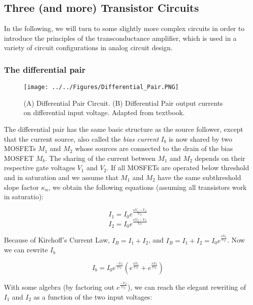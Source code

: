 \subsection{Three (and more) Transistor Circuits}

In the following, we will turn to some slightly more complex circuits in order to introduce the principles of the transconductance amplifier, which is used in a variety of circuit configurations in analog circuit design.

\subsubsection{The differential pair}
\label{section:diffpair}
\begin{figure}[H]
    \centering
    \texttt{[image: ../../Figures/Differential\_Pair.PNG]}
    \caption{(A) Differential Pair Circuit. (B) Differential Pair output currents on differential input voltage. Adapted from textbook.}
    \label{fig:Differential_Pair}
\end{figure}

The differential pair has the same basic structure as the source follower, except that the current source, also called the \textit{bias current} $I_b$ is now shared by two MOSFETs $M_1$ and $M_2$ whose sources are connected to the drain of the bias MOSFET $M_b$. The sharing of the current between $M_1$ and $M_2$ depends on their respective gate voltages $V_1$ and $V_2$. If all MOSFETs are operated below threshold and in saturation and we assume that $M_1$ and $M_2$ have the same subthreshold slope factor $\kappa_n$, we obtain the following equations (assuming all transistors work in saturatio):

\begin{equation}
    I_1 = I_0 e^{\frac{\kappa V_1 - V_S}{U_T}}
\end{equation}
\begin{equation}
    I_2 = I_0 e^{\frac{\kappa V_2 - V_S}{U_T}}
\end{equation}

Because of Kirchoff's Current Law, $I_B = I_1 + I_2$, and $I_B = I_1 + I_2 = I_0 e^{\frac{\kappa V_b}{U_T}}$. Now we can rewrite $I_b$

\begin{equation}
    I_b = I_0 e^{\frac{-V_S}{U_T}} (e^{\frac{\kappa V_1}{U_T}} + e^{\frac{\kappa V_2}{U_T}})
\end{equation}

With some algebra (by factoring out $e^{\frac{-V_S}{U_T}}$), we can reach the elegant rewriting of $I_1$ and $I_2$ as a function of the two input voltages:

